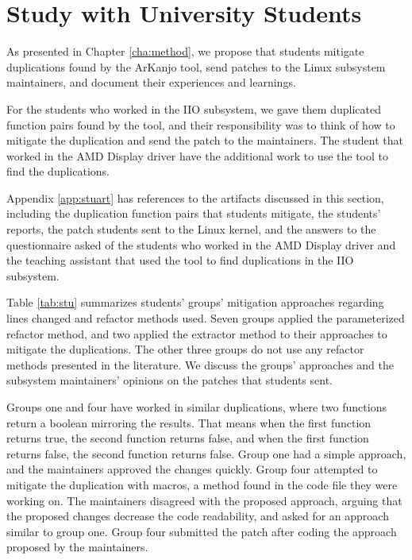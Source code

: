 \section{Study with University Students}

As presented in Chapter \ref{cha:method}, we propose that students mitigate duplications 
found by the ArKanjo tool, send patches to the Linux subsystem maintainers, and document 
their experiences and learnings.

For the students who worked in the IIO subsystem, we gave them duplicated function pairs 
found by the tool, and their responsibility was to think of how to mitigate the duplication 
and send the patch to the maintainers. The student that worked in the AMD Display driver 
have the additional work to use the tool to find the duplications.

Appendix \ref{app:stuart} has references to the artifacts discussed in this section, 
including the duplication function pairs that students mitigate, the students’ reports, 
the patch students sent to the Linux kernel, and the answers to the questionnaire asked 
of the students who worked in the AMD Display driver and the teaching assistant that used 
the tool to find duplications in the IIO subsystem.



Table \ref{tab:stu} summarizes students' groups' mitigation approaches regarding lines 
changed and refactor methods used. Seven groups applied the parameterized refactor method, 
and two applied the extractor method to their approaches to mitigate the duplications. 
The other three groups do not use any refactor methods presented in the literature. 
We discuss the groups' approaches and the subsystem maintainers' opinions on the patches 
that students sent.

Groups one and four have worked in similar duplications, where two functions return a 
boolean mirroring the results. That means when the first function returns true, the second 
function returns false, and when the first function returns false, the second function 
returns false. Group one had a simple approach, and the maintainers approved the changes quickly. 
Group four attempted to mitigate the duplication with macros, a method found in the code file 
they were working on. The maintainers disagreed with the proposed approach, arguing that the 
proposed changes decrease the code readability, and asked for an approach similar to group one. 
Group four submitted the patch after coding the approach proposed by the maintainers.

